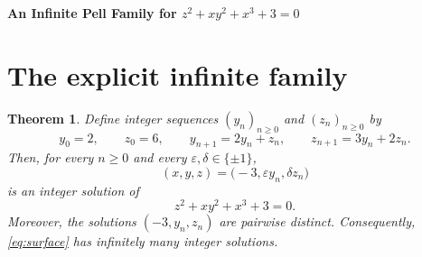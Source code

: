\documentclass[10pt]{article}
\newtheorem{theorem}{Theorem}
\begin{document}
\begin{center}
{\LARGE\bfseries An Infinite Pell Family for $z^2+xy^2+x^3+3=0$\par}
\vspace{0.55em}
\end{center}
\vspace{0.5em}

\begin{abstract}
We prove, by an explicit elementary construction, that
\[
 z^2+xy^2+x^3+3=0
\]
has infinitely many integer solutions.  Fixing $x=-3$ reduces the equation to the Pell-type conic $z^2-3y^2=24$.  A norm-preserving recurrence, obtained from the unit $2+\sqrt3$, then generates an infinite strictly increasing sequence of solutions.  We also explain in detail how this useful slice and its recurrence arise.
\end{abstract}

\section{The explicit infinite family}

\begin{theorem}\label{thm:main}
Define integer sequences $(y_n)_{n\ge 0}$ and $(z_n)_{n\ge 0}$ by
\begin{equation}\label{eq:recurrence}
 y_0=2,\qquad z_0=6,
 \qquad
 y_{n+1}=2y_n+z_n,\qquad
 z_{n+1}=3y_n+2z_n.
\end{equation}
Then, for every $n\ge 0$ and every $\varepsilon,\delta\in\{\pm1\}$,
\begin{equation}\label{eq:family}
 (x,y,z)=\bigl(-3,\varepsilon y_n,\delta z_n\bigr)
\end{equation}
is an integer solution of
\begin{equation}\label{eq:surface}
 z^2+xy^2+x^3+3=0.
\end{equation}
Moreover, the solutions $(-3,y_n,z_n)$ are pairwise distinct.  Consequently, \eqref{eq:surface} has infinitely many integer solutions.
\end{theorem}
\end{document}
